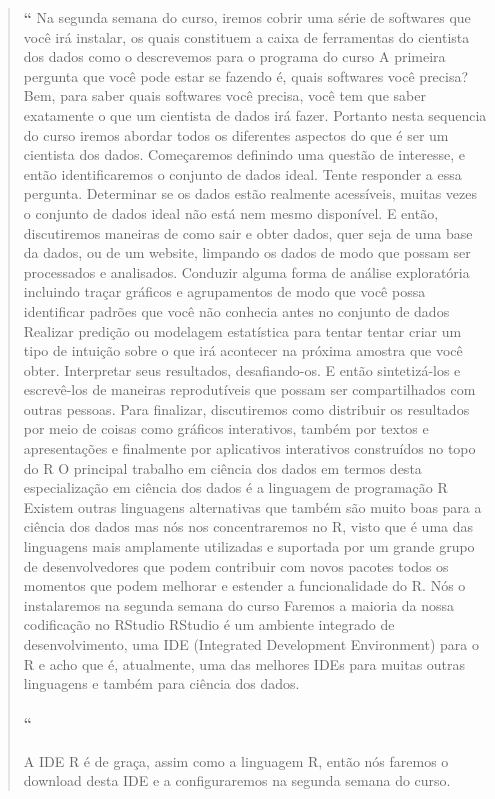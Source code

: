 \begin{quotation}%
\begin{small}
{\large\textbf{``}}%
Na segunda semana do curso, iremos cobrir uma série de softwares que você irá instalar, os quais constituem a caixa de ferramentas do cientista dos dados como o descrevemos para o programa do curso A primeira pergunta que você pode estar se fazendo é, quais softwares você precisa?  Bem, para saber quais softwares você precisa, você tem que  saber exatamente o que um cientista de dados irá fazer. Portanto nesta sequencia do curso iremos abordar  todos os diferentes aspectos do que é ser um cientista dos dados. Começaremos definindo uma questão de interesse, e então identificaremos o conjunto de dados ideal. Tente responder a essa pergunta. Determinar se os dados estão realmente acessíveis, muitas vezes o conjunto de dados ideal não está nem mesmo disponível. E então, discutiremos maneiras de como sair e obter dados, quer seja de uma base da dados, ou de um website, limpando os dados de modo que possam ser processados e analisados. Conduzir alguma forma de análise exploratória incluindo traçar gráficos e agrupamentos de modo que você possa identificar padrões que você não conhecia antes no conjunto de dados Realizar predição ou modelagem estatística para tentar tentar criar um tipo de intuição sobre o que irá acontecer na próxima amostra que você obter. Interpretar seus resultados, desafiando-os. E então sintetizá-los e escrevê-los de maneiras reprodutíveis que possam ser compartilhados com outras pessoas. Para finalizar, discutiremos como distribuir os resultados por meio de coisas como gráficos interativos, também por textos e apresentações e finalmente por aplicativos interativos construídos no topo do R O principal trabalho em ciência dos dados em termos desta especialização em ciência dos dados é a linguagem de programação R Existem outras linguagens alternativas que também são muito boas para a ciência dos dados mas nós nos concentraremos no R, visto que é uma das linguagens mais amplamente utilizadas e suportada por um grande grupo de desenvolvedores que podem contribuir com novos pacotes todos os momentos que podem melhorar e estender a funcionalidade do R. Nós o instalaremos na segunda semana do curso Faremos a maioria da nossa codificação no RStudio RStudio é um ambiente integrado de desenvolvimento, uma IDE (Integrated Development Environment) para o R e acho que é, atualmente, uma das melhores IDEs para muitas outras linguagens e também para ciência dos dados.

\paragraph{``}
A IDE R é de graça, assim como a linguagem R, então nós faremos o download desta IDE e a configuraremos na segunda semana do curso.


\end{small}
\end{quotation}

